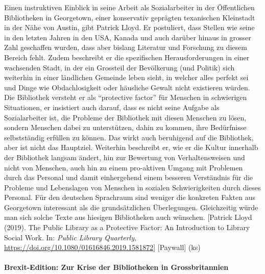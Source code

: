 \documentclass[a4paper,
fontsize=11pt,
oneside,
numbers=noperiodatend,
parskip=half-,
bibliography=totoc,
final
]{scrartcl}
\begin{document}
Einen instruktiven Einblick in seine Arbeit als Sozialarbeiter in der
Öffentlichen Bibliotheken in Georgetown, einer konservativ geprägten
texanischen Kleinstadt in der Nähe von Austin, gibt Patrick Lloyd. Er
postuliert, dass Stellen wie seine in den letzten Jahren in den USA,
Kanada und auch darüber hinaus in grosser Zahl geschaffen wurden, dass
aber bislang Literatur und Forschung zu diesem Bereich fehlt. Zudem
beschreibt er die spezifischen Herausforderungen in einer wachsenden
Stadt, in der ein Grossteil der Bevölkerung (und Politik) sich weiterhin
in einer ländlichen Gemeinde leben sieht, in welcher alles perfekt sei
und Dinge wie Obdachlosigkeit oder häusliche Gewalt nicht existieren
würden. Die Bibliothek versteht er als \enquote{protective factor} für
Menschen in schwierigen Situationen, er insistiert auch darauf, dass es
nicht seine Aufgabe als Sozialarbeiter ist, die Probleme der Bibliothek
mit diesen Menschen zu lösen, sondern Menschen dabei zu unterstützen,
dahin zu kommen, ihre Bedürfnisse selbstständig erfüllen zu können. Das
wirkt auch beruhigend auf die Bibliothek, aber ist nicht das Hauptziel.
Weiterhin beschreibt er, wie er die Kultur innerhalb der Bibliothek
langsam ändert, hin zur Bewertung von Verhaltensweisen und nicht von
Menschen, auch hin zu einem pro-aktiven Umgang mit Problemen durch das
Personal und damit einhergehend einem besseren Verständnis für die
Probleme und Lebenslagen von Menschen in sozialen Schwierigkeiten durch
dieses Personal. Für den deutschen Sprachraum sind weniger die konkreten
Fakten aus Georgetown interessant als die grundsätzlichen Überlegungen.
Gleichzeitig würde man sich solche Texte aus hiesigen Bibliotheken auch
wünschen. {[}Patrick Lloyd (2019). The Public Library as a Protective
Factor: An Introduction to Library Social Work. In: \emph{Public Library
Quarterly}, \url{https://doi.org/10.1080/01616846.2019.1581872}{]}
{[}Paywall{]} (ks)

\hypertarget{brexit-edition-zur-krise-der-bibliotheken-in-grossbritannien}{%
\paragraph{Brexit-Edition: Zur Krise der Bibliotheken in
Grossbritannien}\label{brexit-edition-zur-krise-der-bibliotheken-in-grossbritannien}}
\end{document}
